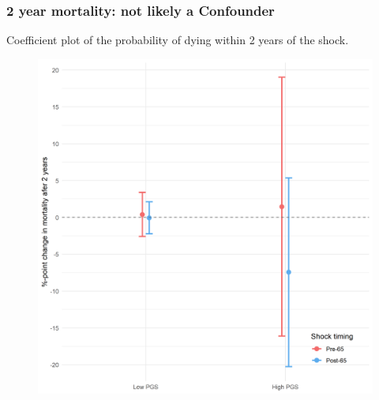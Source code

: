\documentclass[10pt,compress,xcolor=dvipsnames,aspectratio=169]{beamer}    %
\newcounter{ex}
\newcommand{\1}[1]{\mathrm{1\hspace*{-2.5pt}l}[#1]}	%
\begin{document}
\begin{frame}
\frametitle{2 year mortality: not likely a Confounder}
Coefficient plot of the probability of dying within 2 years of the shock.
\begin{figure}[hbtp]
\centering
\includegraphics[height=0.8\textheight]{../../3_output/shock_effects/dead2_6070_100_cvplot.png}
\label{fig:dead2}
\end{figure}
\end{frame}
\end{document}
